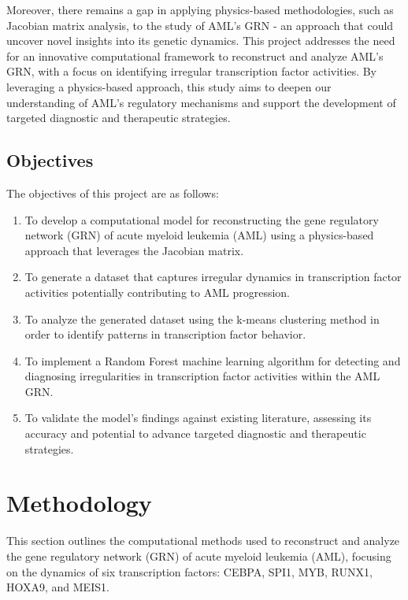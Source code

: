 \documentclass[a4paper,12pt]{article}
\begin{document}
Moreover, there remains a gap in applying physics-based methodologies, such as Jacobian matrix analysis, to the study of AML’s GRN - an approach that could uncover novel insights into its genetic dynamics. This project addresses the need for an innovative computational framework to reconstruct and analyze AML’s GRN, with a focus on identifying irregular transcription factor activities. By leveraging a physics-based approach, this study aims to deepen our understanding of AML’s regulatory mechanisms and support the development of targeted diagnostic and therapeutic strategies.

\subsection{Objectives}
The objectives of this project are as follows:
\begin{enumerate}
	\item To develop a computational model for reconstructing the gene regulatory network (GRN) of acute myeloid leukemia (AML) using a physics-based approach that leverages the Jacobian matrix.
	\item To generate a dataset that captures irregular dynamics in transcription factor activities potentially contributing to AML progression.
	\item To analyze the generated dataset using the k-means clustering method in order to identify patterns in transcription factor behavior.
	\item To implement a Random Forest machine learning algorithm for detecting and diagnosing irregularities in transcription factor activities within the AML GRN.
	\item To validate the model’s findings against existing literature, assessing its accuracy and potential to advance targeted diagnostic and therapeutic strategies.
\end{enumerate}



\section{Methodology}
\label{sec:methodology}
This section outlines the computational methods used to reconstruct and analyze the gene regulatory network (GRN) of acute myeloid leukemia (AML), focusing on the dynamics of six transcription factors: CEBPA, SPI1, MYB, RUNX1, HOXA9, and MEIS1.
\end{document}
